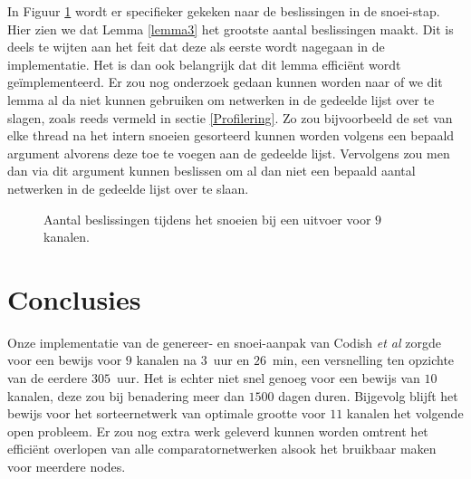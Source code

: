 \documentclass{article}
\begin{document}
In Figuur \ref{AantalSnoeiBeslissingen9Kanalen} wordt er specifieker gekeken naar de beslissingen in de snoei-stap.
Hier zien we dat Lemma \ref{lemma3} het grootste aantal beslissingen maakt.
Dit is deels te wijten aan het feit dat deze als eerste wordt nagegaan in de implementatie.
Het is dan ook belangrijk dat dit lemma effici\"ent wordt ge\"implementeerd.
Er zou nog onderzoek gedaan kunnen worden naar of we dit lemma al da niet kunnen gebruiken om netwerken in de gedeelde lijst over te slagen, zoals reeds vermeld in sectie \ref{Profilering}.
Zo zou bijvoorbeeld de set van elke thread na het intern snoeien gesorteerd kunnen worden volgens een bepaald argument alvorens deze toe te voegen aan de gedeelde lijst.
Vervolgens zou men dan via dit argument kunnen beslissen om al dan niet een bepaald aantal netwerken in de gedeelde lijst over te slaan.
\begin{figure}[!h]
\centering
\caption{Aantal beslissingen tijdens het snoeien bij een uitvoer voor $9$ kanalen.}
\label{AantalSnoeiBeslissingen9Kanalen}
\end{figure}

\section{Conclusies}
Onze implementatie van de genereer- en snoei-aanpak van Codish \textit{et al} zorgde voor een bewijs voor $9$ kanalen na $3$~uur en $26$~min, een versnelling ten opzichte van de eerdere $305$~uur.
Het is echter niet snel genoeg voor een bewijs van $10$ kanalen, deze zou bij benadering meer dan $1500$ dagen duren.
Bijgevolg blijft het bewijs voor het sorteernetwerk van optimale grootte voor $11$ kanalen het volgende open probleem.
Er zou nog extra werk geleverd kunnen worden omtrent het effici\"ent overlopen van alle comparatornetwerken alsook het bruikbaar maken voor meerdere nodes.
\end{document}
